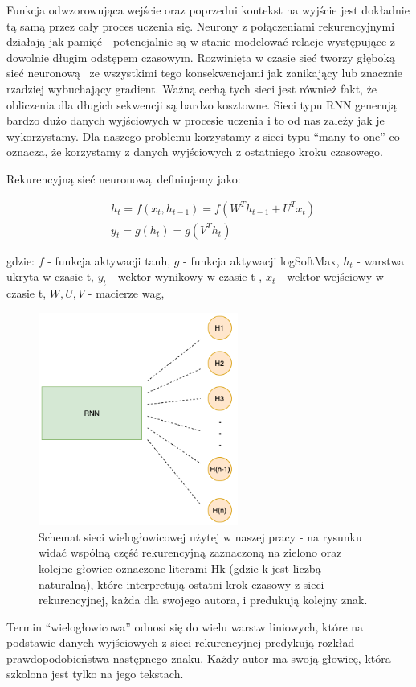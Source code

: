 Funkcja odwzorowująca wejście oraz poprzedni kontekst na wyjście jest dokładnie tą samą przez cały proces
uczenia się. Neurony z połączeniami rekurencyjnymi działają jak pamięć - potencjalnie są w stanie modelować relacje
występujące z dowolnie długim odstępem czasowym. 
Rozwinięta w czasie sieć tworzy głęboką sieć neuronową 
ze wszystkimi tego konsekwencjami jak zanikający lub znacznie rzadziej wybuchający gradient. 
Ważną cechą tych sieci jest również fakt, że obliczenia dla długich sekwencji są bardzo kosztowne.
Sieci typu RNN generują bardzo dużo danych wyjściowych w procesie uczenia i to od nas zależy jak je 
wykorzystamy. Dla naszego problemu korzystamy z sieci typu ``many to one'' co oznacza, że korzystamy
z danych wyjściowych z ostatniego kroku czasowego.

\newpage
Rekurencyjną sieć neuronową definiujemy jako:

\begin{align}
  &h_t = f(x_t, h_{t-1}) = f(W^Th_{t-1} + U^Tx_t) \\ 
  &y_t = g(h_t) = g(V^Th_t)
\end{align}

gdzie: \newline
$f$ - funkcja aktywacji tanh, \newline
$g$ - funkcja aktywacji logSoftMax, \newline
$h_t$ - warstwa ukryta w czasie t, \newline
$y_t$ - wektor wynikowy w czasie t , \newline
$x_t$ - wektor wejściowy w czasie t, \newline
$W, U, V$ - macierze wag, \newline


\begin{figure}[H]
\centering
\includegraphics[height=7cm]{./images/multiheaded-rnn.png}
\caption{Schemat sieci wielogłowicowej użytej w naszej pracy - na rysunku widać wspólną część rekurencyjną zaznaczoną na zielono
oraz kolejne głowice oznaczone literami Hk (gdzie k jest liczbą naturalną), które interpretują ostatni krok czasowy z sieci rekurencyjnej, każda
dla swojego autora, i predukują kolejny znak.}
\label{fig:test5}
\end{figure}

Termin ``wielogłowicowa'' odnosi się do wielu warstw liniowych, które na podstawie danych wyjściowych z 
sieci rekurencyjnej predykują rozkład prawdopodobieństwa następnego znaku. Każdy autor ma swoją głowicę, która 
szkolona jest tylko na jego tekstach.